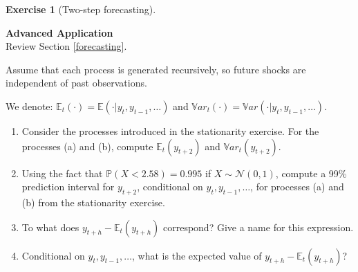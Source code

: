 \documentclass[
  11pt,
]{book}
\theoremstyle{definition}
\theoremstyle{definition}
\theoremstyle{definition}
\newtheorem{exercise}{Exercise}[chapter]
\theoremstyle{definition}
\theoremstyle{remark}
\begin{document}
\begin{exercisebox}

\begin{exercise}[Two-step forecasting]
\protect\hypertarget{exr:time-series-forecasting}{}\label{exr:time-series-forecasting}

\textbf{Advanced \textbar{} Application}\\
Review Section \ref{forecasting}.

Assume that each process is generated recursively, so future shocks are independent of past observations.

We denote: \(\mathbb{E}_t(\cdot) = \mathbb{E}(\cdot | y_t, y_{t-1}, \dots)\) and \(\mathbb{V}ar_t(\cdot) = \mathbb{V}ar(\cdot | y_t, y_{t-1}, \dots)\).

\begin{enumerate}
\def\labelenumi{\arabic{enumi}.}
\item
  Consider the processes introduced in the stationarity exercise. For the processes (a) and (b), compute \(\mathbb{E}_t(y_{t+2})\) and \(\mathbb{V}ar_t(y_{t+2})\).
\item
  Using the fact that \(\mathbb{P}(X < 2.58) = 0.995\) if \(X \sim \mathcal{N}(0,1)\), compute a 99\% prediction interval for \(y_{t+2}\), conditional on \(y_t,y_{t-1},\dots\), for processes (a) and (b) from the stationarity exercise.
\item
  To what does \(y_{t+h} - \mathbb{E}_t(y_{t+h})\) correspond? Give a name for this expression.
\item
  Conditional on \(y_t, y_{t-1}, \dots\), what is the expected value of \(y_{t+h} - \mathbb{E}_t(y_{t+h})\)?
\end{enumerate}

\end{exercise}

\end{exercisebox}

\end{document}
